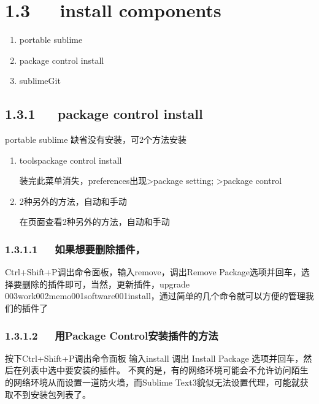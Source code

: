 \documentclass[letterpaper,12pt,english]{sphinxmanual}
\begin{document}
\section{1.3   install components}
\label{\detokenize{001software/001install/sublime:install-components}}\begin{enumerate}
%
\item {} 
portable sublime

\item {} 
package control install

\item {} 
sublimeGit

\end{enumerate}


\subsection{1.3.1   package control install}
\label{\detokenize{001software/001install/sublime:package-control-install}}
portable sublime 缺省没有安装，可2个方法安装
\begin{enumerate}
%
\item {} 
tools\sphinxhyphen{}package control install

装完此菜单消失，preferences出现\sphinxhyphen{}>package setting; \sphinxhyphen{}>package control

\item {} 
2种另外的方法，自动和手动

在页面查看2种另外的方法，自动和手动

\end{enumerate}


\subsubsection{1.3.1.1   如果想要删除插件，}
\label{\detokenize{001software/001install/sublime:id2}}
\begin{sphinxVerbatim}[commandchars=\\\{\}]
Ctrl+Shift+P调出命令面板，输入remove，调出Remove Package选项并回车，选择要删除的插件即可，当然，更新插件，upgrade \PYGZbs{}003work\PYGZbs{}002memo\PYGZbs{}001software\PYGZbs{}001install，通过简单的几个命令就可以方便的管理我们的插件了
\end{sphinxVerbatim}


\subsubsection{1.3.1.2   用Package Control安装插件的方法}
\label{\detokenize{001software/001install/sublime:package-control}}
\begin{sphinxVerbatim}[commandchars=\\\{\}]
按下Ctrl+Shift+P调出命令面板
输入install 调出 Install Package 选项并回车，然后在列表中选中要安装的插件。
不爽的是，有的网络环境可能会不允许访问陌生的网络环境从而设置一道防火墙，而Sublime Text3貌似无法设置代理，可能就获取不到安装包列表了。
\end{sphinxVerbatim}
\end{document}
